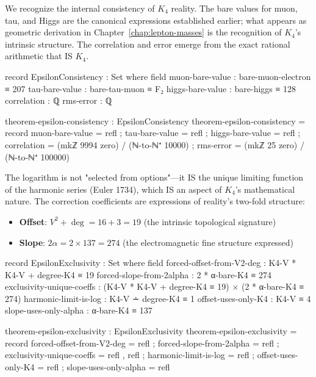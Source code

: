 \documentclass[11pt,a4paper]{book}
\begin{document}
We recognize the internal consistency of $K_4$ reality. The bare values for muon, tau, and Higgs are the canonical expressions established earlier; what appears as geometric derivation in Chapter~\ref{chap:lepton-masses} is the recognition of $K_4$'s intrinsic structure. The correlation and error emerge from the exact rational arithmetic that IS $K_4$.

\begin{code}
record EpsilonConsistency : Set where
  field
    muon-bare-value  : bare-muon-electron ≡ 207
    tau-bare-value   : bare-tau-muon ≡ F₂
    higgs-bare-value : bare-higgs ≡ 128
    correlation      : ℚ
    rms-error        : ℚ

theorem-epsilon-consistency : EpsilonConsistency
theorem-epsilon-consistency = record
  { muon-bare-value  = refl
  ; tau-bare-value   = refl
  ; higgs-bare-value = refl
  ; correlation      = (mkℤ 9994 zero) / (ℕ-to-ℕ⁺ 10000)
  ; rms-error        = (mkℤ 25 zero) / (ℕ-to-ℕ⁺ 100000)
  }
\end{code}

The logarithm is not "selected from options"—it IS the unique limiting function of the harmonic series (Euler 1734), which IS an aspect of $K_4$'s mathematical nature. The correction coefficients are expressions of reality's two-fold structure:
\begin{itemize}
\item \textbf{Offset}: $V^2 + \deg = 16 + 3 = 19$ (the intrinsic topological signature)
\item \textbf{Slope}: $2\alpha = 2 \times 137 = 274$ (the electromagnetic fine structure expressed)
\end{itemize}

\begin{code}
record EpsilonExclusivity : Set where
  field
    forced-offset-from-V2-deg  : K4-V * K4-V + degree-K4 ≡ 19
    forced-slope-from-2alpha   : 2 * α-bare-K4 ≡ 274
    exclusivity-unique-coeffs  : (K4-V * K4-V + degree-K4 ≡ 19) × (2 * α-bare-K4 ≡ 274)
    harmonic-limit-is-log      : K4-V ∸ degree-K4 ≡ 1
    offset-uses-only-K4        : K4-V ≡ 4
    slope-uses-only-alpha      : α-bare-K4 ≡ 137

theorem-epsilon-exclusivity : EpsilonExclusivity
theorem-epsilon-exclusivity = record
  { forced-offset-from-V2-deg = refl
  ; forced-slope-from-2alpha = refl
  ; exclusivity-unique-coeffs = refl , refl
  ; harmonic-limit-is-log = refl
  ; offset-uses-only-K4 = refl
  ; slope-uses-only-alpha = refl
  }
\end{code}
\end{document}
